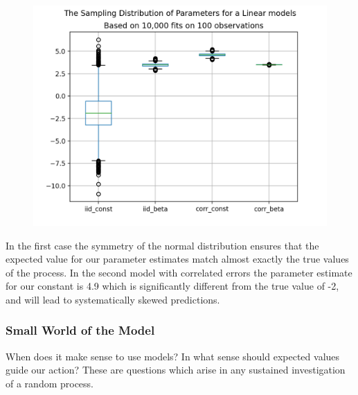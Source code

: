 \documentclass[10pt,a4paper,notitlepage, twocolumn]{article}
\begin{document}
\begin{figure}[H]
  \includegraphics[width=\linewidth]{./Plots/distribution_of_beta1.png}
\end{figure}

In the first case the symmetry of the normal distribution ensures that the expected value for our parameter estimates match almost exactly the true values of the process. In the second model with correlated errors  the parameter estimate for our constant is 4.9 which is significantly different from the true value of -2, and will lead to systematically skewed predictions.

\subsubsection*{Small World of the Model}
When does it make sense to use models? In what sense should expected values guide our action? These are questions which arise in any sustained investigation of a random process. 
\end{document}
